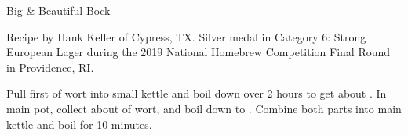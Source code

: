 \stylesection{\styledopplebock}

\begin{recipe}{Big \& Beautiful Bock} %

\begin{aboutblock}
Recipe by Hank Keller of Cypress, TX. Silver medal in Category 6: Strong European
Lager during the 2019 National Homebrew Competition Final Round in Providence, RI.
\sourceaha
\end{aboutblock}


\begin{methodandtiming}
 
\begin{mashsteps}
\end{mashsteps}

\begin{fermentationsteps}
\end{fermentationsteps}

\begin{directions}
Pull first  of wort into small kettle and boil down over 2 hours to
get about . In main pot, collect about  of wort, and
boil down to . Combine both parts into main kettle and boil
for 10 minutes.
\end{directions}

\end{methodandtiming}

\recipebreak

\begin{ingredientsblock}

\begin{malts}
\end{malts}

\begin{hops}
\end{hops}


\end{ingredientsblock}

\end{recipe}
